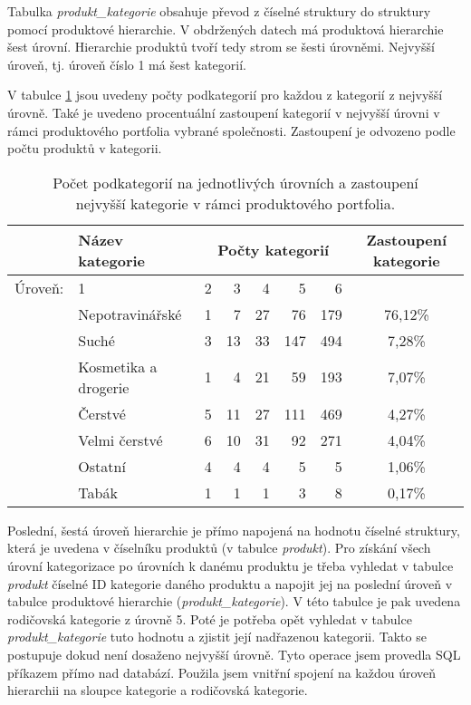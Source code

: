 Tabulka \emph{produkt\_kategorie} obsahuje převod z číselné struktury do struktury pomocí produktové hierarchie. V obdržených datech má produktová hierarchie šest úrovní. Hierarchie produktů tvoří tedy strom se šesti úrovněmi. Nejvyšší úroveň, tj. úroveň číslo 1 má šest kategorií.

V tabulce \ref*{tab:d:4Bzast} jsou uvedeny počty podkategorií pro každou z kategorií z nejvyšší úrovně. Také je uvedeno procentuální zastoupení kategorií v nejvyšší úrovni v rámci produktového portfolia vybrané společnosti. Zastoupení je odvozeno podle počtu produktů v kategorii.

\begin{table}[hbtp!]
    \captionsetup{justification=centering}
    \begin{center}
    \caption{Počet podkategorií na jednotlivých úrovních a zastoupení \\ nejvyšší kategorie v rámci produktového portfolia.}
    \label{tab:d:4Bzast}
    \begin{tabular}{rp{4cm}  r r r r r  c}
        & Název kategorie & \multicolumn{5}{c}{Počty kategorií} &      Zastoupení kategorie      \\
        \midrule

        Úroveň: & 1       & 2    & 3   & 4   & 5    & 6    &  \\

        \midrule
        & Nepotravinářské    & 1     & 7    & 27   & 76    & 179   & 76,12\%              \\
        & Suché         & 3     & 13   & 33   & 147   & 494   & 7,28\%               \\
        & Kosmetika a drogerie        & 1     & 4    & 21   & 59    & 193   & 7,07\%               \\
        & Čerstvé       & 5     & 11   & 27   & 111   & 469   & 4,27\%               \\
        & Velmi čerstvé & 6     & 10   & 31   & 92    & 271   & 4,04\%               \\
        & Ostatní     & 4     & 4    & 4    & 5     & 5     & 1,06\%               \\
        & Tabák    & 1     & 1    & 1    & 3     & 8     & 0,17\%   \\
    \end{tabular}
    \end{center}
    \end{table}

Poslední, šestá úroveň hierarchie je přímo napojená na hodnotu číselné struktury, která je uvedena v číselníku produktů (v tabulce \emph{produkt}). Pro získání všech úrovní kategorizace po úrovních k danému produktu je třeba vyhledat v tabulce \emph{produkt} číselné ID kategorie daného produktu a napojit jej na poslední úroveň v tabulce produktové hierarchie (\emph{produkt\_kategorie}). V této tabulce je pak uvedena rodičovská kategorie z úrovně 5. Poté je potřeba opět vyhledat v tabulce \emph{produkt\_kategorie} tuto hodnotu a zjistit její nadřazenou kategorii. Takto se postupuje dokud není dosaženo nejvyšší úrovně. Tyto operace jsem provedla SQL příkazem přímo nad databází. Použila jsem vnitřní spojení na každou úroveň hierarchii na sloupce kategorie a rodičovská kategorie.

